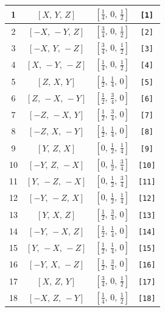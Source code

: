 \documentclass[fleqn,8pt]{jsarticle}
\begin{document}
\begin{longtable}{cccc}
1 & $\left[ X,\, Y,\, Z \right]$ & $\left[ \frac{1}{4},\, 0,\, \frac{1}{2} \right]$ & {\tt [1]} \\ \hline
2 & $\left[ - X,\, - Y,\, Z \right]$ & $\left[ \frac{3}{4},\, 0,\, \frac{1}{2} \right]$ & {\tt [2]} \\ \hline
3 & $\left[ - X,\, Y,\, - Z \right]$ & $\left[ \frac{3}{4},\, 0,\, \frac{1}{2} \right]$ & {\tt [3]} \\ \hline
4 & $\left[ X,\, - Y,\, - Z \right]$ & $\left[ \frac{1}{4},\, 0,\, \frac{1}{2} \right]$ & {\tt [4]} \\ \hline
5 & $\left[ Z,\, X,\, Y \right]$ & $\left[ \frac{1}{2},\, \frac{1}{4},\, 0 \right]$ & {\tt [5]} \\ \hline
6 & $\left[ Z,\, - X,\, - Y \right]$ & $\left[ \frac{1}{2},\, \frac{3}{4},\, 0 \right]$ & {\tt [6]} \\ \hline
7 & $\left[ - Z,\, - X,\, Y \right]$ & $\left[ \frac{1}{2},\, \frac{3}{4},\, 0 \right]$ & {\tt [7]} \\ \hline
8 & $\left[ - Z,\, X,\, - Y \right]$ & $\left[ \frac{1}{2},\, \frac{1}{4},\, 0 \right]$ & {\tt [8]} \\ \hline
9 & $\left[ Y,\, Z,\, X \right]$ & $\left[ 0,\, \frac{1}{2},\, \frac{1}{4} \right]$ & {\tt [9]} \\ \hline
10 & $\left[ - Y,\, Z,\, - X \right]$ & $\left[ 0,\, \frac{1}{2},\, \frac{3}{4} \right]$ & {\tt [10]} \\ \hline
11 & $\left[ Y,\, - Z,\, - X \right]$ & $\left[ 0,\, \frac{1}{2},\, \frac{3}{4} \right]$ & {\tt [11]} \\ \hline
12 & $\left[ - Y,\, - Z,\, X \right]$ & $\left[ 0,\, \frac{1}{2},\, \frac{1}{4} \right]$ & {\tt [12]} \\ \hline
13 & $\left[ Y,\, X,\, Z \right]$ & $\left[ \frac{1}{2},\, \frac{3}{4},\, 0 \right]$ & {\tt [13]} \\ \hline
14 & $\left[ - Y,\, - X,\, Z \right]$ & $\left[ \frac{1}{2},\, \frac{1}{4},\, 0 \right]$ & {\tt [14]} \\ \hline
15 & $\left[ Y,\, - X,\, - Z \right]$ & $\left[ \frac{1}{2},\, \frac{1}{4},\, 0 \right]$ & {\tt [15]} \\ \hline
16 & $\left[ - Y,\, X,\, - Z \right]$ & $\left[ \frac{1}{2},\, \frac{3}{4},\, 0 \right]$ & {\tt [16]} \\ \hline
17 & $\left[ X,\, Z,\, Y \right]$ & $\left[ \frac{3}{4},\, 0,\, \frac{1}{2} \right]$ & {\tt [17]} \\ \hline
18 & $\left[ - X,\, Z,\, - Y \right]$ & $\left[ \frac{1}{4},\, 0,\, \frac{1}{2} \right]$ & {\tt [18]} \\ \hline

\end{longtable}
\end{document}

